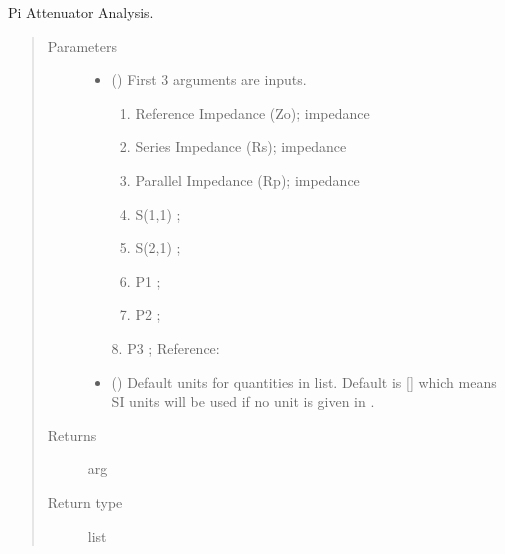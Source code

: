 \documentclass[letterpaper,10pt,english]{sphinxmanual}
\begin{document}

\begin{fulllineitems}
\label{\detokenize{components:components.Pi_Attenuator_Analysis}}
Pi Attenuator Analysis.
\begin{quote}\begin{description}
\item[{Parameters}] \leavevmode\begin{itemize}
\item {} 
 () \textendash{} 
First 3 arguments are inputs.
\begin{enumerate}
%
\item {} 
Reference Impedance (Zo); impedance

\item {} 
Series Impedance (Rs); impedance

\item {} 
Parallel Impedance (Rp); impedance

\item {} 
S(1,1) ;

\item {} 
S(2,1) ;

\item {} 
P1 ;

\item {} 
P2 ;

\end{enumerate}

8. P3 ;
Reference:


\item {} 
 (\sphinxstyleliteralemphasis{\sphinxupquote{, }}) \textendash{} Default units for quantities in  list. Default is {[}{]} which means SI units will be used if no unit is given in .

\end{itemize}

\item[{Returns}] \leavevmode
arg

\item[{Return type}] \leavevmode
list

\end{description}\end{quote}

\end{fulllineitems}
\end{document}
